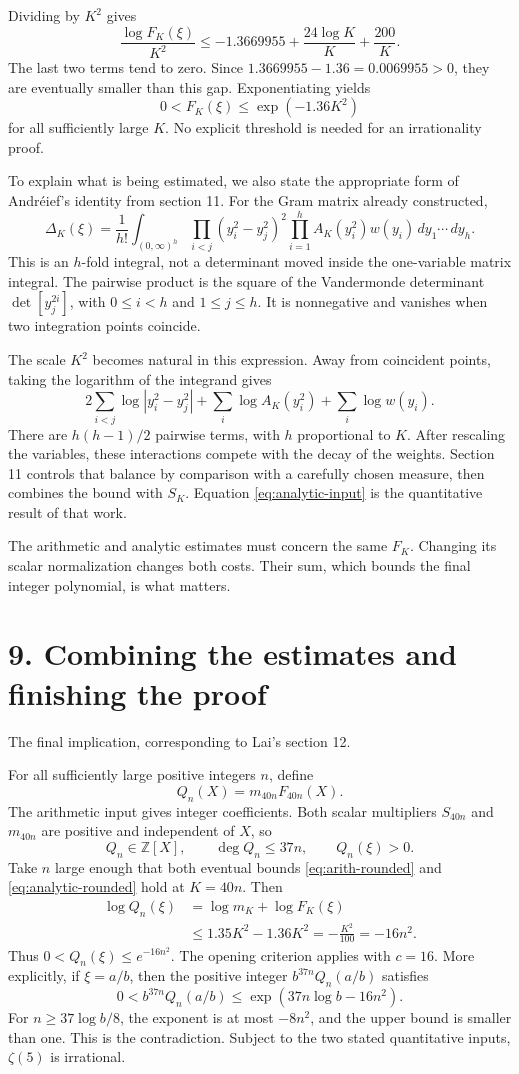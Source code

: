 \documentclass[11pt]{article}
\newcommand{\Z}{\mathbb Z}
\newcommand{\dd}{\,d}
\newcommand{\source}[1]{{\small\color{blue!45!black}#1}\par}
\newcommand{\heading}[2]{\section*{#1}\source{#2}}
\begin{document}
Dividing by $K^2$ gives
\[
 \frac{\log F_K(\xi)}{K^2}
 \leq-1.3669955+\frac{24\log K}{K}+\frac{200}{K}.
\]
The last two terms tend to zero. Since
$1.3669955-1.36=0.0069955>0$, they are eventually smaller than this gap.
Exponentiating yields
\begin{equation}\label{eq:analytic-rounded}
 \boxed{0<F_K(\xi)\leq\exp(-1.36K^2)}
\end{equation}
for all sufficiently large $K$. No explicit threshold is needed for an
irrationality proof.

To explain what is being estimated, we also state the appropriate form of
Andr\'eief's identity from section 11. For the Gram matrix already constructed,
\begin{equation}\label{eq:andreief}
 \Delta_K(\xi)=\frac1{h!}\int_{(0,\infty)^h}
 \prod_{i<j}(y_i^2-y_j^2)^2
 \prod_{i=1}^h A_K(y_i^2)w(y_i)\dd y_1\cdots\dd y_h.
\end{equation}
This is an $h$-fold integral, not a determinant moved inside the one-variable
matrix integral. The pairwise product is the square of the Vandermonde
determinant $\det[y_j^{2i}]$, with $0\leq i<h$ and $1\leq j\leq h$.
It is nonnegative and vanishes when two integration points coincide.

The scale $K^2$ becomes natural in this expression. Away from coincident
points, taking the logarithm of the integrand gives
\[
 2\sum_{i<j}\log|y_i^2-y_j^2|
 +\sum_i\log A_K(y_i^2)+\sum_i\log w(y_i).
\]
There are $h(h-1)/2$ pairwise terms, with $h$ proportional to $K$.
After rescaling the variables, these interactions compete with the decay
of the weights. Section 11 controls that balance by comparison with a
carefully chosen measure, then combines the bound with $S_K$.
Equation \eqref{eq:analytic-input} is the quantitative result of that work.

The arithmetic and analytic estimates must concern the same $F_K$.
Changing its scalar normalization changes both costs. Their sum, which
bounds the final integer polynomial, is what matters.

\newpage
\heading{9. Combining the estimates and finishing the proof}{The final implication, corresponding to Lai's section 12.}
For all sufficiently large positive integers $n$, define
\[
 Q_n(X)=m_{40n}F_{40n}(X).
\]
The arithmetic input gives integer coefficients. Both scalar multipliers
$S_{40n}$ and $m_{40n}$ are positive and independent of $X$, so
\[
 Q_n\in\Z[X],\qquad \deg Q_n\leq37n,
 \qquad Q_n(\xi)>0.
\]
Take $n$ large enough that both eventual bounds
\eqref{eq:arith-rounded} and \eqref{eq:analytic-rounded} hold at $K=40n$.
Then
\begin{align*}
 \log Q_n(\xi)
 &=\log m_K+\log F_K(\xi)\\
 &\leq1.35K^2-1.36K^2
 =-\frac{K^2}{100}=-16n^2.
\end{align*}
Thus $0<Q_n(\xi)\leq e^{-16n^2}$. The opening criterion applies with
$c=16$. More explicitly, if $\xi=a/b$, then the positive integer
$b^{37n}Q_n(a/b)$ satisfies
\[
 0<b^{37n}Q_n(a/b)
 \leq\exp(37n\log b-16n^2).
\]
For $n\geq37\log b/8$, the exponent is at most $-8n^2$, and the upper
bound is smaller than one. This is the contradiction. Subject to the two
stated quantitative inputs, $\zeta(5)$ is irrational.
\end{document}

